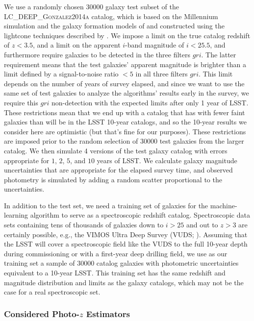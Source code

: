 \documentclass[DM,lsstdraft,toc]{lsstdoc}
\begin{document}
We use a randomly chosen 30000 galaxy test subset of the \textsc{LC\_DEEP\_Gonzalez2014a} catalog, which is based on the Millennium simulation \citep{2005Natur.435..629S} and the galaxy formation models of \cite{2014MNRAS.439..264G} and constructed using the lightcone techniques described by \cite{2013MNRAS.429..556M}. We impose a limit on the true catalog redshift of $z<3.5$, and a limit on the apparent $i$-band magnitude of $i<25.5$, and furthermore require galaxies to be detected in the three filters $gri$. The latter requirement means that the test galaxies' apparent magnitude is brighter than a limit defined by a signal-to-noise ratio $<5$ in all three filters $gri$. This limit depends on the number of years of survey elapsed, and since we want to use the same set of test galaxies to analyze the algorithms' results early in the survey, we require this $gri$ non-detection with the expected limits after only 1 year of LSST. These restrictions mean that we end up with a catalog that has with fewer faint galaxies than will be in the LSST 10-year catalogs, and so the 10-year results we consider here are optimistic (but that's fine for our purposes). These restrictions are imposed prior to the random selection of 30000 test galaxies from the larger catalog. We then simulate 4 versions of the test galaxy catalog with errors appropriate for $1$, $2$, $5$, and $10$ years of LSST. We calculate galaxy magnitude uncertainties that are appropriate for the elapsed survey time, and observed photometry is simulated by adding a random scatter proportional to the uncertainties.

In addition to the test set, we need a training set of galaxies for the machine-learning algorithm to serve as a spectroscopic redshift catalog. Spectroscopic data sets containing tens of thousands of galaxies down to $i>25$ and out to $z>3$ are certainly possible, e.g., the VIMOS Ultra Deep Survey (VUDS; \citealt{2015A&A...576A..79L}). Assuming that the LSST will cover a spectroscopic field like the VUDS to the full 10-year depth during commissioning or with a first-year deep drilling field, we use as our training set a sample of 30000 catalog galaxies with photometric uncertainties equivalent to a 10-year LSST. This training set has the same redshift and magnitude distribution and limits as the galaxy catalogs, which may not be the case for a real spectroscopic set.

\subsubsection{Considered Photo-$z$ Estimators}\label{sssec:sel_ex_estimators}
\end{document}
